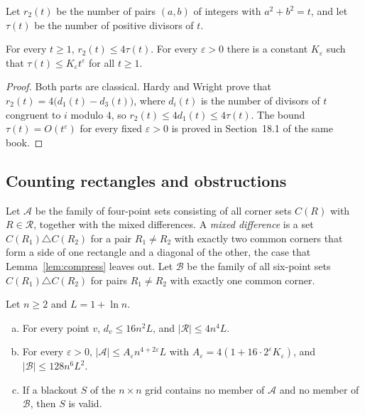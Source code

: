 Let $r_2(t)$ be the number of pairs $(a,b)$ of integers with $a^2+b^2=t$, and let $\tau(t)$ be the number of positive divisors of $t$.

\begin{lemma}\label{lem:divisor}
For every $t\ge1$, $r_2(t)\le4\tau(t)$. For every $\varepsilon>0$ there is a constant $K_\varepsilon$ such that $\tau(t)\le K_\varepsilon t^\varepsilon$ for all $t\ge1$.
\end{lemma}

\begin{proof}
Both parts are classical. Hardy and Wright \cite[Section~16.9]{hardywright2008} prove that $r_2(t)=4\bigl(d_1(t)-d_3(t)\bigr)$, where $d_i(t)$ is the number of divisors of $t$ congruent to $i$ modulo $4$, so $r_2(t)\le4d_1(t)\le4\tau(t)$. The bound $\tau(t)=O(t^\varepsilon)$ for every fixed $\varepsilon>0$ is proved in Section~18.1 of the same book.
\end{proof}

\subsection{Counting rectangles and obstructions}

Let $\mathcal A$ be the family of four-point sets consisting of all corner sets $C(R)$ with $R\in\mathcal R$, together with the mixed differences. A \emph{mixed difference} is a set $C(R_1)\triangle C(R_2)$ for a pair $R_1\ne R_2$ with exactly two common corners that form a side of one rectangle and a diagonal of the other, the case that Lemma~\ref{lem:compress} leaves out. Let $\mathcal B$ be the family of all six-point sets $C(R_1)\triangle C(R_2)$ for pairs $R_1\ne R_2$ with exactly one common corner.

\begin{lemma}\label{lem:counts}
Let $n\ge2$ and $L=1+\ln n$.
\begin{enumerate}[(a)]
\item For every point $v$, $d_v\le16n^2L$, and $|\mathcal R|\le4n^4L$.
\item For every $\varepsilon>0$, $|\mathcal A|\le A_\varepsilon n^{4+2\varepsilon}L$ with $A_\varepsilon=4(1+16\cdot2^\varepsilon K_\varepsilon)$, and $|\mathcal B|\le128n^6L^2$.
\item If a blackout $S$ of the $n\times n$ grid contains no member of $\mathcal A$ and no member of $\mathcal B$, then $S$ is valid.
\end{enumerate}
\end{lemma}

